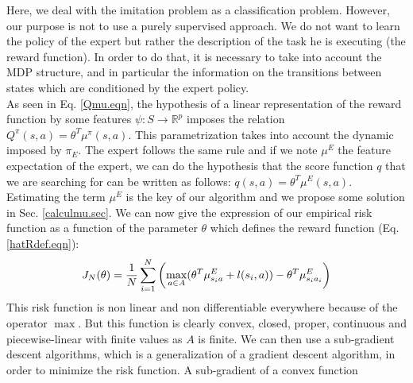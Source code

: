 \documentclass{article}
\begin{document}
Here, we deal with the imitation problem as a classification problem. However, our purpose is not to use a purely supervised approach. We do not want to learn the policy of the expert but rather the description of the task he is executing (the reward function). In order to do that, it is necessary to take into account the MDP structure, and in particular the information on the transitions between states which are conditioned by the expert policy.\\
As seen in Eq. \eqref{Qmu.eqn}, the hypothesis of a linear representation of the reward function by some features $\psi: S\rightarrow \mathbb{R}^p$ imposes the relation $Q^\pi(s,a) = \theta^T\mu^\pi(s,a)$. This parametrization takes into account the dynamic imposed by $\pi_E$. The expert follows the same rule and if we note $\mu^E$ the feature expectation of the expert, we can do the hypothesis that the score function $q$ that we are searching for can be written as follows: $q(s,a) = \theta^T\mu^E(s,a)$.
Estimating the term $\mu^E$ is the key of our algorithm and we propose some solution in Sec. \ref{calculmu.sec}.
We can now give the expression of our empirical risk function as a function of the parameter $\theta$ which defines the reward function (Eq. \eqref{hatRdef.eqn}):
\begin{equation}
\label{structure.eqn}
J_N(\theta)  = {1\over N} \sum_{i=1}^N\left(\max_{a\in A}(\theta ^T \mu^E_{s_ia} + l(s_i,a)) - \theta ^T \mu^E_{s_ia_i} \right)
\end{equation}
This risk function is non linear and non differentiable everywhere because of the operator $\max$. But this function is clearly convex, closed, proper, continuous and piecewise-linear with finite values as $A$ is finite. We can then use a sub-gradient descent algorithms, which is a generalization of a gradient descent algorithm, in order to minimize the risk function. A sub-gradient of a convex function
\end{document}
